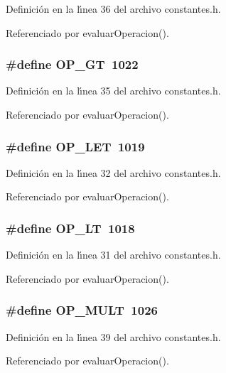 Definici\'{o}n en la l\'{\i}nea 36 del archivo constantes.h.

Referenciado por evaluar\-Operacion().
\subsubsection{\setlength{\rightskip}{0pt plus 5cm}\#define OP\_\-GT~1022}\label{constantes_8h_a24}




Definici\'{o}n en la l\'{\i}nea 35 del archivo constantes.h.

Referenciado por evaluar\-Operacion().
\subsubsection{\setlength{\rightskip}{0pt plus 5cm}\#define OP\_\-LET~1019}\label{constantes_8h_a21}




Definici\'{o}n en la l\'{\i}nea 32 del archivo constantes.h.

Referenciado por evaluar\-Operacion().
\subsubsection{\setlength{\rightskip}{0pt plus 5cm}\#define OP\_\-LT~1018}\label{constantes_8h_a20}




Definici\'{o}n en la l\'{\i}nea 31 del archivo constantes.h.

Referenciado por evaluar\-Operacion().
\subsubsection{\setlength{\rightskip}{0pt plus 5cm}\#define OP\_\-MULT~1026}\label{constantes_8h_a28}




Definici\'{o}n en la l\'{\i}nea 39 del archivo constantes.h.

Referenciado por evaluar\-Operacion().
